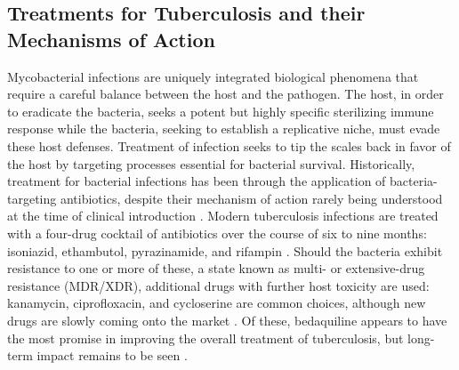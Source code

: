 
\subsection{Treatments for Tuberculosis and their Mechanisms of Action}\label{treatments}

Mycobacterial infections are uniquely integrated biological phenomena that require a careful balance between the host and the pathogen. The host, in order to eradicate the bacteria, seeks a potent but highly specific sterilizing immune response while the bacteria, seeking to establish a replicative niche, must evade these host defenses. Treatment of infection seeks to tip the scales back in favor of the host by targeting processes essential for bacterial survival. Historically, treatment for bacterial infections has been through the application of bacteria\hyp{}targeting antibiotics, despite their mechanism of action rarely being understood at the time of clinical introduction \citep{DAmbrosio2015, Osborne2013}. Modern tuberculosis infections are treated with a four\hyp{}drug cocktail of antibiotics over the course of six to nine months: isoniazid, ethambutol, pyrazinamide, and rifampin \citep{Dorman2021, Grace2019}. Should the bacteria exhibit resistance to one or more of these, a state known as multi\hyp{} or extensive\hyp{}drug resistance (MDR/XDR), additional drugs with further host toxicity are used: kanamycin, ciprofloxacin, and cycloserine are common choices, although new drugs are slowly coming onto the market \citep{Quenard2017, Jang2020, Nahid2019}. Of these, bedaquiline appears to have the most promise in improving the overall treatment of tuberculosis, but long\hyp{}term impact remains to be seen \citep{Mahajan2013, Pym2016, Furin2017}. 

